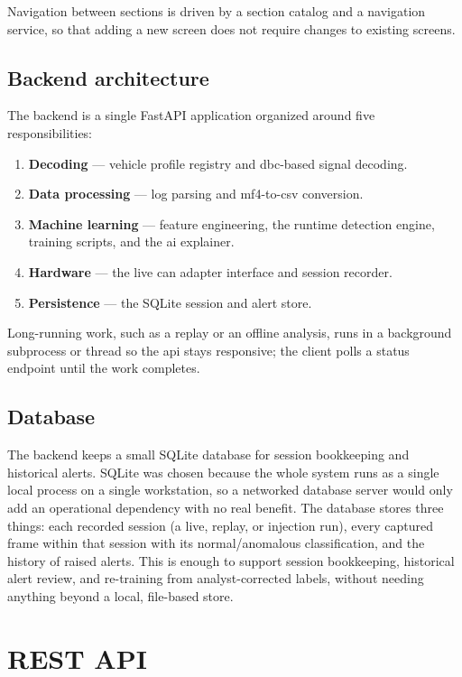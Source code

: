 Navigation between sections is driven by a section catalog and a navigation service, so that adding a new screen does not require changes to existing screens.

\subsection{Backend architecture}

The backend is a single FastAPI application organized around five responsibilities:

\begin{enumerate}
    \item \textbf{Decoding} --- vehicle profile registry and \gls{dbc}-based signal decoding.
    \item \textbf{Data processing} --- log parsing and \gls{mf4}-to-\gls{csv} conversion.
    \item \textbf{Machine learning} --- feature engineering, the runtime detection engine, training scripts, and the \gls{ai} explainer.
    \item \textbf{Hardware} --- the live \gls{can} adapter interface and session recorder.
    \item \textbf{Persistence} --- the SQLite session and alert store.
\end{enumerate}

Long-running work, such as a replay or an offline analysis, runs in a background subprocess or thread so the \gls{api} stays responsive; the client polls a status endpoint until the work completes.

\subsection{Database}

The backend keeps a small SQLite database for session bookkeeping and historical alerts. SQLite was chosen because the whole system runs as a single local process on a single workstation, so a networked database server would only add an operational dependency with no real benefit. The database stores three things: each recorded session (a live, replay, or injection run), every captured frame within that session with its normal/anomalous classification, and the history of raised alerts. This is enough to support session bookkeeping, historical alert review, and re-training from analyst-corrected labels, without needing anything beyond a local, file-based store.

\section{REST API}

